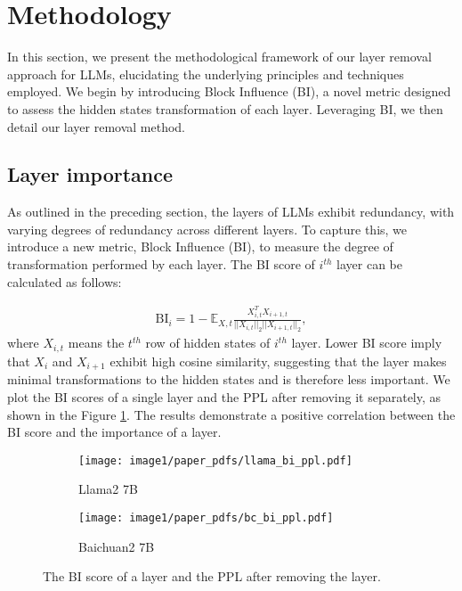 		
		
		
		\section{Methodology}
		In this section, we present the methodological framework of our layer removal approach for LLMs, elucidating the underlying principles and techniques employed. We begin by introducing Block Influence (BI), a novel metric designed to assess the hidden states transformation of each layer. Leveraging BI, we then detail our layer removal method.
		
		
		
		\subsection{Layer importance} \label{method:layerimportacne}
		As outlined in the preceding section, the layers of LLMs exhibit redundancy, with varying degrees of redundancy across different layers. To capture this, we introduce a new metric, Block Influence (BI), to measure the degree of transformation performed by each layer.   The BI score of $i^{th}$ layer can be calculated as follows: 
		
		
		\begin{align}
			\text{BI}_i = 1 - \mathbb{E}_{X,t} \frac{X_{i,t}^TX_{i+1,t}}{||X_{i,t}||_2||X_{i+1,t}||_2},
		\end{align}
		where $X_{i,t}$ means the $t^{th}$ row of hidden states of $i^{th}$ layer. Lower BI score imply that $X_i$ and $X_{i+1}$ exhibit high cosine similarity, suggesting that the layer makes minimal transformations to the hidden states and is therefore less important. We plot the BI scores of a single layer and the PPL after removing it separately, as shown in the Figure \ref{fig:bi_ppl}. The results demonstrate a positive correlation between the BI score and the importance of a layer.
		
		\begin{figure}[t]
			\centering
			\begin{subfigure}[t]{0.49\textwidth}
				\centering  
				\texttt{[image: image1/paper\_pdfs/llama\_bi\_ppl.pdf]}
				\caption{Llama2 7B}
			\end{subfigure}
			\hfill
			\begin{subfigure}[t]{0.49\textwidth}
				\centering  
				\texttt{[image: image1/paper\_pdfs/bc\_bi\_ppl.pdf]}
				\caption{Baichuan2 7B }
			\end{subfigure}
			\caption{The BI score of a layer and the PPL after removing the layer. }    %
			\label{fig:bi_ppl}    %
		\end{figure}
		
